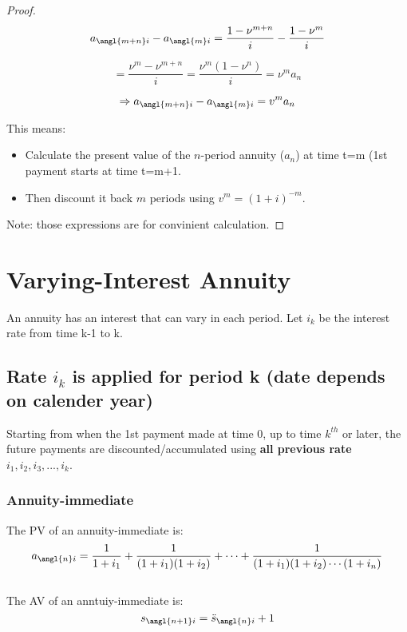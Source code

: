 \begin{proof}
    \[
a_{\angl{m+n}i} - a_{\angl{m}i} = \frac{1 - \nu^{m+n}}{i} - \frac{1 - \nu^m}{i}
\]

\[
= \frac{\nu^m - \nu^{m+n}}{i}
= \frac{\nu^m (1 - \nu^n)}{i}
= \nu^m a_n
\]

\[
\Rightarrow a_{\angl{m+n}i} - a_{\angl{m}i} = v^m a_n
\]

This means:
\begin{itemize}
    \item Calculate the present value of the \( n \)-period annuity (\( a_n \)) at time t=m (1st payment starts at time t=m+1. 
    \item Then discount it back \( m \) periods using \( v^m = (1 + i)^{-m} \).
\end{itemize}

Note: those expressions are for convinient calculation.

\end{proof}
\section{Varying-Interest Annuity}
\begin{definition}
    An annuity has an interest that can vary in each period. Let $i_k$ be the interest rate from time k-1 to k. 
\end{definition}

\subsection{Rate $i_k$ is applied for period k (date depends on calender year)}
\begin{comments}
    Starting from when the 1st payment made at time 0, up to time $k^{th}$ or later, the future payments are discounted/accumulated using \textbf{all previous rate} $i_1, i_2, i_3,...,i_k$. \\
\end{comments}


\subsubsection{Annuity-immediate}
\begin{comments}

    The PV of an annuity-immediate is: 
    \[ a_{\angl{n}i} = \frac{1}{1 + i_1} + \frac{1}{(1 + i_1)(1 + i_2)} + \cdots + \frac{1}{(1 + i_1)(1 + i_2) \cdots (1 + i_n)} \] \\
    The AV of an anntuiy-immediate is:
    \[ s_{\angl{n+1}i} = \ddot{s}_{\angl{n}i} + 1 \] \\
\end{comments}


